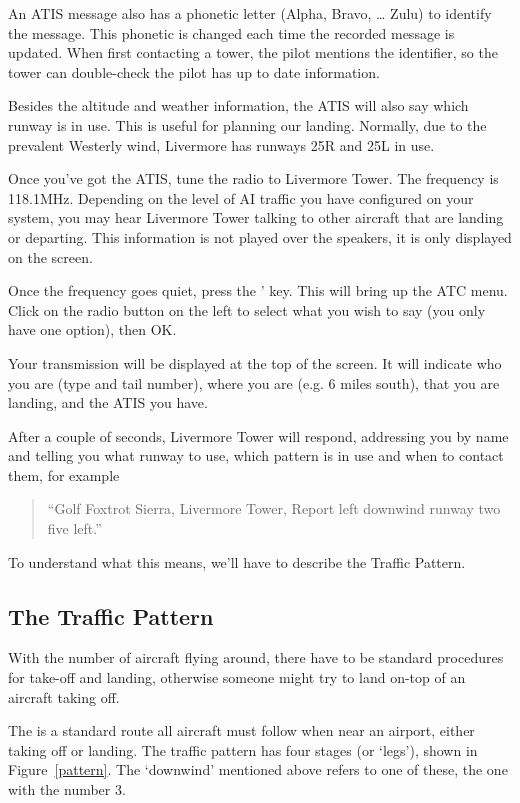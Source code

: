 An ATIS message also has a phonetic letter (Alpha, Bravo, \ldots{} Zulu) to identify
the message. This phonetic is changed each time the recorded message is updated.
When first contacting a tower, the pilot mentions the identifier, so the tower can
double-check the pilot has up to date information.

Besides the altitude and weather information, the ATIS will also say which runway is in use.
This is useful for planning our landing. Normally, due to the prevalent Westerly wind,
Livermore has runways 25R and 25L in use.

Once you've got the ATIS, tune the radio to Livermore Tower. The frequency is 118.1MHz.
Depending on the level of AI traffic you have configured on your system, you may hear
Livermore Tower talking to other aircraft that are landing or departing.
This information is not played over the speakers, it is only displayed on the screen.

Once the frequency goes quiet, press the ' key. This will bring up the ATC menu.
Click on the radio button on the left to select what you wish to say (you only have one option), then OK.

Your transmission will be displayed at the top of the screen.
It will indicate who you are (type and tail number), where you are (e.g. 6 miles south),
that you are landing, and the ATIS you have.

After a couple of seconds, Livermore Tower will respond, addressing you by name and
telling you what runway to use, which pattern is in use and when to contact them, for example

\begin{quote}
``Golf Foxtrot Sierra, Livermore Tower, Report left downwind runway two five left.''
\end{quote}

To understand what this means, we'll have to describe the Traffic Pattern.

\subsection{The Traffic Pattern}

With the number of aircraft flying around, there have to be standard procedures
for take-off and landing, otherwise someone might try to land on-top of an aircraft taking off.

The  is a standard route all aircraft must follow when
near an airport, either taking off or landing. The traffic pattern has four
stages (or `legs'), shown in Figure~\ref{pattern}. The `downwind' mentioned
above refers to one of these, the one with the number 3.

